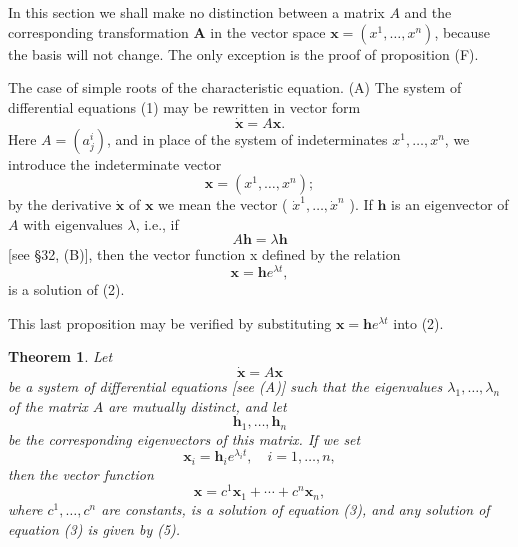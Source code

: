 \documentclass[10pt,a5paper]{book}
\theoremstyle{plain}
\newtheorem{theorem}{Theorem}
\theoremstyle{definition}
\theoremstyle{remark}
\begin{document}
In this section we shall make no distinction between a matrix $A$ and the corresponding transformation $\mathbf{A}$ in the vector space $\mathbf{x}=\left(x^{1}, \ldots, x^{n}\right)$, because the basis will not change. The only exception is the proof of proposition (F).

The case of simple roots of the characteristic equation. (A) The system of differential equations (1) may be rewritten in vector form
\begin{equation*}
\dot{\mathbf{x}}=A \mathbf{x} . \tag{2}
\end{equation*}
Here $A=\left(a_{j}^{i}\right)$, and in place of the system of indeterminates $x^{1}, \ldots, x^{n}$, we introduce the indeterminate vector
\[
\mathbf{x}=\left(x^{1}, \ldots, x^{n}\right) ;
\]
by the derivative $\dot{\mathbf{x}}$ of $\mathbf{x}$ we mean the vector ( $\dot{x}^{1}, \ldots, \dot{x}^{n}$ ). If $\mathbf{h}$ is an eigenvector of $A$ with eigenvalues $\lambda$, i.e., if
\[
A \mathbf{h}=\lambda \mathbf{h}
\]
[see §32, (B)], then the vector function x defined by the relation
\[
\mathbf{x}=\mathbf{h} e^{\lambda t},
\]
is a solution of (2).

This last proposition may be verified by substituting $\mathbf{x}=\mathbf{h} e^{\lambda t}$ into (2).

\begin{theorem}
Let
\begin{equation*}
\dot{\mathbf{x}}=A \mathbf{x} \tag{3}
\end{equation*}
be a system of differential equations [see (A)] such that the eigenvalues
$\lambda_{1}, \ldots, \lambda_{n}$ of the matrix $A$ are mutually distinct, and let
\[
\mathbf{h}_{1}, \ldots, \mathbf{h}_{n}
\]
be the corresponding eigenvectors of this matrix. If we set
\begin{equation*}
\mathbf{x}_{i}=\mathbf{h}_{i} e^{\lambda_{i} t}, \quad i=1, \ldots, n, \tag{4}
\end{equation*}
then the vector function
\begin{equation*}
\mathbf{x}=c^{1} \mathbf{x}_{1}+\cdots+c^{n} \mathbf{x}_{n}, \tag{5}
\end{equation*}
where $c^{1}, \ldots, c^{n}$ are constants, is a solution of equation (3), and any solution of equation (3) is given by (5).
\end{theorem}
\end{document}
